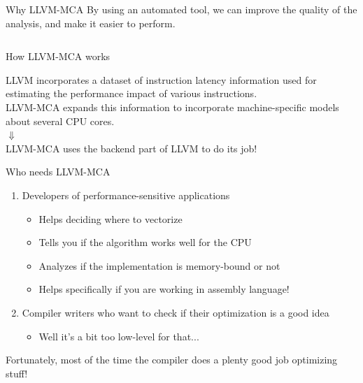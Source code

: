 \begin{frame}{Why LLVM-MCA}
By using an automated tool, we can \alert{improve} the quality of the analysis,
and make it easier to perform.\\
\medskip
\begin{columns}

\end{columns}
\end{frame}


\begin{frame}{How LLVM-MCA works}
\begin{center}
LLVM incorporates a \alert{dataset of instruction latency information} used for estimating the performance impact of various instructions.\\
\bigskip
LLVM-MCA expands this information to incorporate \alert{machine-specific models} about several CPU cores.\\
\medskip
$\Downarrow$\\
\medskip
LLVM-MCA uses the \alert{backend} part of LLVM to do its job!
\end{center}
\end{frame}


\begin{frame}{Who needs LLVM-MCA}
\begin{enumerate}
\item Developers of performance-sensitive applications 
	\begin{itemize}
	\item Helps deciding where to vectorize
	\item Tells you if the algorithm works well for the CPU
	\item Analyzes if the implementation is memory-bound or not
	\item Helps specifically if you are working in assembly language!
	\end{itemize}
\item Compiler writers who want to check if their optimization is a good idea
	\begin{itemize}
	\item Well it's a bit too low-level for that...
	\end{itemize}
\end{enumerate}
\bigskip
Fortunately, most of the time the compiler does a plenty good job optimizing stuff!
\end{frame}


